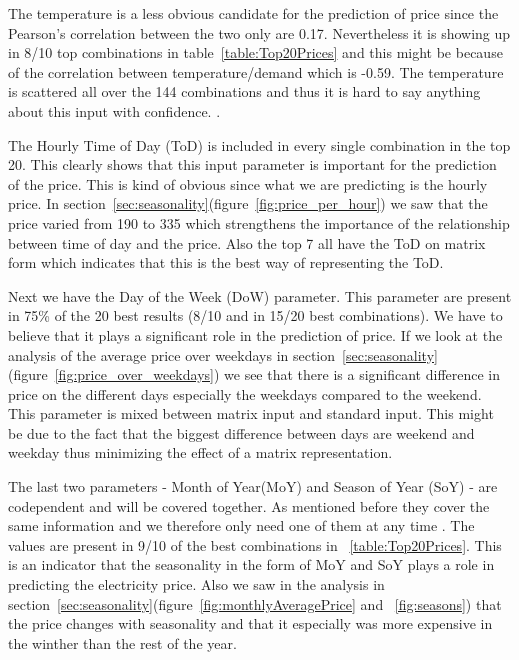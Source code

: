 The temperature is a less obvious candidate for the prediction of price since the Pearson's correlation between the two only are 0.17. Nevertheless it is showing up in 8/10 top combinations in table~\ref{table:Top20Prices} and this might be because of the correlation between temperature/demand which is -0.59. The temperature is scattered all over the 144 combinations and thus it is hard to say anything about this input with confidence. .

The Hourly Time of Day (ToD) is included in every single combination in the top 20. This clearly shows that this input parameter is important for the prediction of the price. This is kind of obvious since what we are predicting is the hourly price. In section~\ref{sec:seasonality}(figure~\ref{fig:price_per_hour}) we saw that the price varied from 190 to 335 which strengthens the importance of the relationship between time of day and the price. Also the top 7 all have the ToD on matrix form which indicates that this is the best way of representing the ToD.

Next we have the Day of the Week (DoW) parameter. This parameter are present in 75\% of the 20 best results (8/10 and in 15/20 best combinations). We have to believe that it plays a significant role in the prediction of price. If we look at the analysis of the average price over weekdays in section~\ref{sec:seasonality}(figure~\ref{fig:price_over_weekdays}) we see that there is a significant difference in price on the different days especially the weekdays compared to the weekend. This parameter is mixed between matrix input and standard input. This might be due to the fact that the biggest difference between days are weekend and weekday thus minimizing the effect of a matrix representation. 

The last two parameters - Month of Year(MoY) and Season of Year (SoY) - are codependent and will be covered together. As mentioned before they cover the same information and we therefore only need one of them at any time . The values are present in 9/10 of the best combinations in ~\ref{table:Top20Prices}. This is an indicator that the seasonality in the form of MoY and SoY plays a role in predicting the electricity price. Also we saw in the analysis in section~\ref{sec:seasonality}(figure~\ref{fig:monthlyAveragePrice} and ~\ref{fig:seasons}) that the price changes with seasonality and that it especially was more expensive in the winther than the rest of the year.


